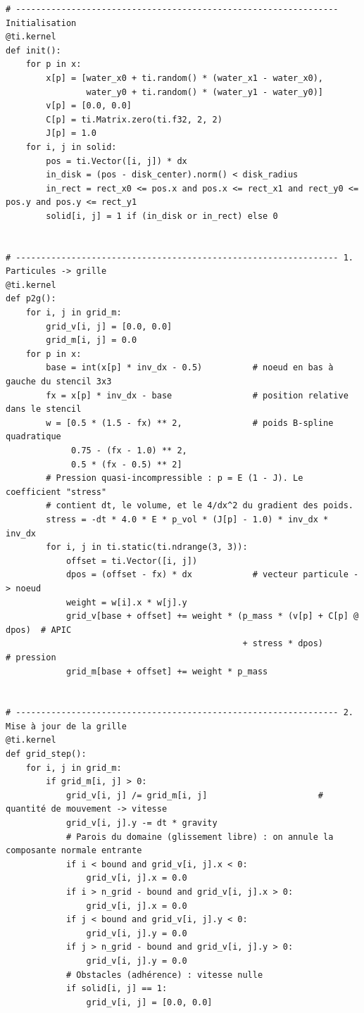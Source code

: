 \documentclass[11pt,a4paper]{article}
\begin{document}
\begin{lstlisting}
# ---------------------------------------------------------------- Initialisation
@ti.kernel
def init():
    for p in x:
        x[p] = [water_x0 + ti.random() * (water_x1 - water_x0),
                water_y0 + ti.random() * (water_y1 - water_y0)]
        v[p] = [0.0, 0.0]
        C[p] = ti.Matrix.zero(ti.f32, 2, 2)
        J[p] = 1.0
    for i, j in solid:
        pos = ti.Vector([i, j]) * dx
        in_disk = (pos - disk_center).norm() < disk_radius
        in_rect = rect_x0 <= pos.x and pos.x <= rect_x1 and rect_y0 <= pos.y and pos.y <= rect_y1
        solid[i, j] = 1 if (in_disk or in_rect) else 0


# ---------------------------------------------------------------- 1. Particules -> grille
@ti.kernel
def p2g():
    for i, j in grid_m:
        grid_v[i, j] = [0.0, 0.0]
        grid_m[i, j] = 0.0
    for p in x:
        base = int(x[p] * inv_dx - 0.5)          # noeud en bas à gauche du stencil 3x3
        fx = x[p] * inv_dx - base                # position relative dans le stencil
        w = [0.5 * (1.5 - fx) ** 2,              # poids B-spline quadratique
             0.75 - (fx - 1.0) ** 2,
             0.5 * (fx - 0.5) ** 2]
        # Pression quasi-incompressible : p = E (1 - J). Le coefficient "stress"
        # contient dt, le volume, et le 4/dx^2 du gradient des poids.
        stress = -dt * 4.0 * E * p_vol * (J[p] - 1.0) * inv_dx * inv_dx
        for i, j in ti.static(ti.ndrange(3, 3)):
            offset = ti.Vector([i, j])
            dpos = (offset - fx) * dx            # vecteur particule -> noeud
            weight = w[i].x * w[j].y
            grid_v[base + offset] += weight * (p_mass * (v[p] + C[p] @ dpos)  # APIC
                                               + stress * dpos)               # pression
            grid_m[base + offset] += weight * p_mass


# ---------------------------------------------------------------- 2. Mise à jour de la grille
@ti.kernel
def grid_step():
    for i, j in grid_m:
        if grid_m[i, j] > 0:
            grid_v[i, j] /= grid_m[i, j]                      # quantité de mouvement -> vitesse
            grid_v[i, j].y -= dt * gravity
            # Parois du domaine (glissement libre) : on annule la composante normale entrante
            if i < bound and grid_v[i, j].x < 0:
                grid_v[i, j].x = 0.0
            if i > n_grid - bound and grid_v[i, j].x > 0:
                grid_v[i, j].x = 0.0
            if j < bound and grid_v[i, j].y < 0:
                grid_v[i, j].y = 0.0
            if j > n_grid - bound and grid_v[i, j].y > 0:
                grid_v[i, j].y = 0.0
            # Obstacles (adhérence) : vitesse nulle
            if solid[i, j] == 1:
                grid_v[i, j] = [0.0, 0.0]



\end{lstlisting}
\end{document}
